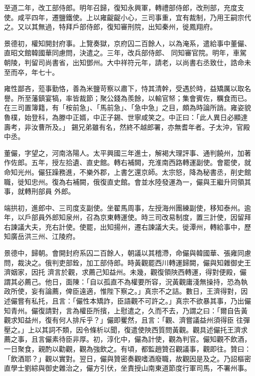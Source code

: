 \begin{pinyinscope}
 至道二年，改工部侍郎。明年召歸，復知永興軍，轉禮部侍郎，改刑部，充度支使。咸平四年，遷鹽鐵使。上以雍齪齪小心，三司事重，宜有裁制，乃用王嗣宗代之。又以其無過，特拜戶部侍郎，復知審刑院，出知秦州，徙鳳翔府。



 景德初，權知開封府事。上覽奏獄，京府囚二百餘人，以為淹系，遣給事中董儼、直昭文館韓國華同慮問，決遣之。三年，改兵部侍郎、
 同知審官院。明年，車駕朝陵，判留司尚書省，出知鄧州。大中祥符元年，請老，以尚書右丞致仕，誥命未至而卒，年七十。



 雍性鄙吝，蒞事勤恪，善為米鹽苛察以肅下，恃其清幹，受遇於時，益矯厲以取名譽。所至藩鎮宴犒，率皆裁節；聚公錢為羨餘，以輸官帑；集會賓佐，糲食而已。在三司置簿籍，有「桉前急」、「馬前急」、「急中急」之目，頗為時論所誚。雍姿貌魯樸，始登科，為滕中正婿，中正子錫、世寧咸笑之。中正曰：「此人異日必顯達壽考，非汝曹所及。」
 錫兄弟雖有名，然終不越郎署，亦無耆年者。子太沖，官殿中丞。



 董儼，字望之，河南洛陽人。太平興國三年進士，解褐大理評事、通判饒州，加著作佐郎。五年，授左拾遺、直史館。轉右補闕，充淮南西路轉運副使。會罷使，就命知光州。儼狂躁務進，不樂外郡，上書乞還京師。太宗怒，降為秘書丞，削史館職，徙知忠州。復為右補闕，俄復直史館。會並水陸發運為一，儼與王繼升同領其事，就轉刑部員
 外郎。



 端拱初，進郎中、三司度支副使。坐翟馬周事，左授海州團練副使，移知泰州。逾年，以戶部員外郎知泉州，召為京東轉運使。時三司改易制度，置三計使，因留拜右諫議大夫，充右計使。使罷，出知揚州，遷右諫議大夫。徙潭州，轉給事中，歷知廣岳洪三州、江陵府。



 景德中，歸朝。會開封府系囚二百餘人，朝議以其稽滯，命儼與韓國華、張雍同慮問，裁決之。俄判吏部銓，加工部侍郎。時黃觀罷西川轉運歸闕，儼與知雜御史王濟姻家，因托
 濟言於觀，求薦己知益州。未幾，觀復領陜西轉運，得對便殿，儼謂其必薦己。他日，面陳：「自以孤直不為權要所容，況黃觀庸淺無操持，恐為執政所使，妄有論薦，俾臣遠適，惟陛下察之。」真宗不之詰。數日，王濟得對，因述儼嘗有私托，且言：「儼性本矯詐，臣語觀不可許之。」真宗不欲暴其事，乃出儼知青州。儼復請對，言為權臣所擯，上慰遣之，久而不去，乃謂之曰：「爾自告黃觀求知益州，復有何人排斥乎？」儼即矍然，且言：「觀、濟嘗議益州須得臣
 往彈壓之。」上以其詞不類，因令條析以聞，復遣使陜西質問黃觀。觀具述儼托王濟求薦之事，且言儼素待臣非厚。初，淳化中，儼為計使，觀為判官。儼知觀不飲酒，一日聚食，親酌以勸觀，觀為強飲之。有頃，都監趙贊召觀議事，觀即往。贊曰：「飲酒耶？」觀以實對。翌日，儼與贊密奏觀嗜酒廢職，故觀因是及之。乃詔樞密直學士劉綜與御史雜治之，儼方引伏，坐責授山南東道節度行軍司馬，不署州事。




\end{pinyinscope}
